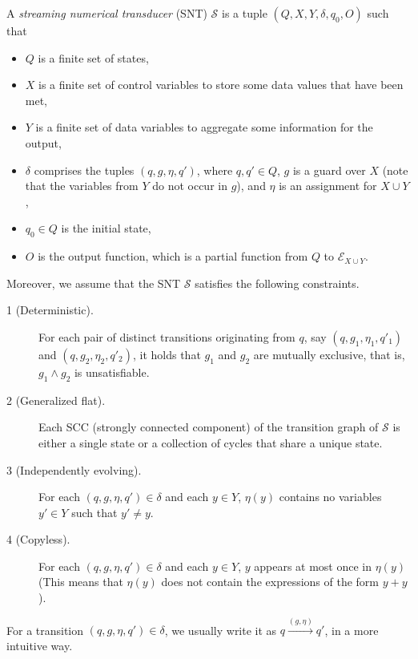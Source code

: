 \documentclass[runningheads,a4paper]{llncs}
\def\Ee{{\mathcal{E} }}
\def\Ss{{\mathcal{S} }}
\begin{document}
A \emph{streaming numerical transducer} (SNT) $\Ss$ is a tuple $(Q, X, Y, \delta, q_0, O)$ such that 
\begin{itemize}
\item $Q$ is a finite set of states,
%
\item $X$ is a finite set of control variables to store some data values that have been met,
%
\item $Y$ is a finite set of data variables to aggregate some information for the output,
%
\item $\delta$ comprises the tuples $(q,  g, \eta, q')$, where $q,q'\in Q$, $g$ is a guard over $X$ (note that the variables from $Y$ do not occur in $g$), and $\eta$ is an assignment for $X \cup Y$, 
%
\item $q_0 \in Q$ is the initial state,
%
\item $O$ is the output function, which is a partial function from $Q$ to $\Ee_{X \cup Y}$.
\end{itemize}
Moreover, we assume that the SNT $\Ss$ satisfies the following constraints.
\begin{description}
\item [1 (Deterministic).] For each pair of distinct transitions originating from $q$, say $(q, g_1, \eta_1,q'_1)$ and $(q, g_2,\eta_2,q'_2)$, it holds that $g_1$ and $g_2$ are mutually exclusive, that is, $g_1 \wedge g_2$ is unsatisfiable.
%
\item [2 (Generalized flat).] Each SCC (strongly connected component) of the transition graph of $\Ss$ is either a single state or a collection of cycles that share a unique state.
%
\item[3 (Independently evolving).] For each $(q, g, \eta, q') \in \delta$ and each $y \in Y$, $\eta(y)$ contains no variables $y' \in Y$ such that $y' \neq y$.
%
\item[4 (Copyless).] For each $(q, g, \eta, q') \in \delta$ and each $y \in Y$, $y$ appears at most once in $\eta(y)$ (This means that $\eta(y)$ does not contain the expressions of the form $y+y$).
%
\end{description}

For a transition $(q,g,\eta,q') \in \delta$, we usually write it as $q \xrightarrow{(g,\eta)} q'$, in a more intuitive way.
\end{document}
